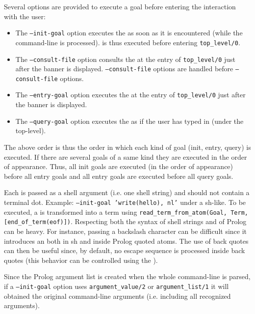 Several options are provided to execute a goal before entering the
interaction with the user:

\begin{itemize}

\item The \texttt{--init-goal} option executes the  as soon as
it is encountered (while the command-line is processed).  is thus
executed before entering \texttt{top\_level/0}.

\item The \texttt{--consult-file} option consults the  at the
entry of \texttt{top\_level/0} just after the banner is displayed. 
\texttt{--consult-file} options are handled before \texttt{--consult-file} options.

\item The \texttt{--entry-goal} option executes the  at the
entry of \texttt{top\_level/0} just after the banner is displayed.

\item The \texttt{--query-goal} option executes the  as if the
user has typed in (under the top-level).

\end{itemize}

The above order is thus the order in which each kind of goal (init, entry,
query) is executed.  If there are several goals of a same kind they are
executed in the order of appearance. Thus, all init goals are executed (in the
order of appearance) before all entry goals and all entry goals are executed
before all query goals.

Each  is passed as a shell argument (i.e. one shell string) and
should not contain a terminal dot. Example: \texttt{--init-goal
  'write(hello), nl'} under a sh-like.  To be executed, a  is
transformed into a term using
\texttt{read\_term\_from\_atom(Goal, Term,
  [end\_of\_term(eof)])}. Respecting both the syntax of shell strings and of
Prolog can be heavy. For instance, passing a backslash character
\texttt{{\bs}} can be difficult since it introduces an 
both in sh and inside Prolog quoted atoms. The use of back quotes can then be
useful since, by default, no escape sequence is processed inside back quotes
(this behavior can be controlled using the   ).


Since the Prolog argument list is created when the whole command-line is
parsed, if a \texttt{--init-goal} option uses \texttt{argument\_value/2} or
\texttt{argument\_list/1} it will obtained the original command-line
arguments (i.e. including all recognized arguments).

